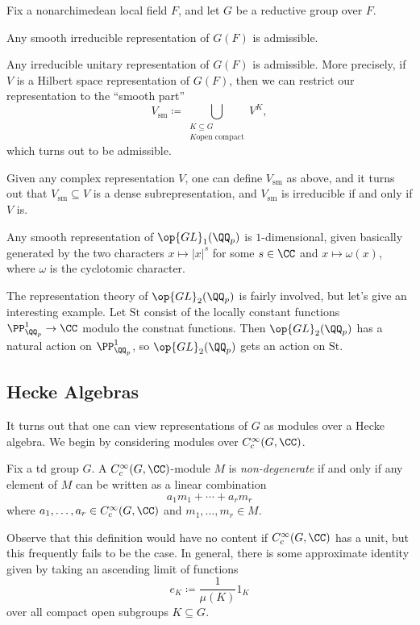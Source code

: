 \documentclass{article}
\begin{document}
\begin{theorem}
	Fix a nonarchimedean local field $F$, and let $G$ be a reductive group over $F$. 
	\begin{listalph}
		\item Any smooth irreducible representation of $G(F)$ is admissible.
		\item Any irreducible unitary representation of $G(F)$ is admissible. More precisely, if $V$ is a Hilbert space representation of $G(F)$, then we can restrict our representation to the ``smooth part''
		\[V_{\mathrm{sm}}\coloneqq\bigcup_{\substack{K\subseteq G\\K\text{open compact}}}V^K,\]
		which turns out to be admissible.
	\end{listalph}
\end{theorem}
\begin{remark}
	Given any complex representation $V$, one can define $V_{\mathrm{sm}}$ as above, and it turns out that $V_{\mathrm{sm}}\subseteq V$ is a dense subrepresentation, and $V_{\mathrm{sm}}$ is irreducible if and only if $V$ is.
\end{remark}
\begin{example}
	Any smooth representation of $\op{GL}_1(\QQ_p)$ is $1$-dimensional, given basically generated by the two characters $x\mapsto\left|x\right|^s$ for some $s\in\CC$ and $x\mapsto\omega(x)$, where $\omega$ is the cyclotomic character.
\end{example}
\begin{example}[Steinberg]
	The representation theory of $\op{GL}_2(\QQ_p)$ is fairly involved, but let's give an interesting example. Let $\mathrm{St}$ consist of the locally constant functions $\PP^1_{\QQ_p}\to\CC$ modulo the constnat functions. Then $\op{GL}_2(\QQ_p)$ has a natural action on $\PP^1_{\QQ_p}$, so $\op{GL}_2(\QQ_p)$ gets an action on $\mathrm{St}$.
\end{example}

\subsection{Hecke Algebras}
It turns out that one can view representations of $G$ as modules over a Hecke algebra. We begin by considering modules over $C_c^\infty(G,\CC)$.
\begin{definition}
	Fix a td group $G$. A $C^\infty_c(G,\CC)$-module $M$ is \textit{non-degenerate} if and only if any element of $M$ can be written as a linear combination
	\[a_1m_1+\cdots+a_rm_r\]
	where $a_1,\ldots,a_r\in C^\infty_c(G,\CC)$ and $m_1,\ldots,m_r\in M$.
\end{definition}
Observe that this definition would have no content if $C^\infty_c(G,\CC)$ has a unit, but this frequently fails to be the case. In general, there is some approximate identity given by taking an ascending limit of functions
\[e_K\coloneqq\frac1{\mu(K)}1_K\]
over all compact open subgroups $K\subseteq G$.
\end{document}
